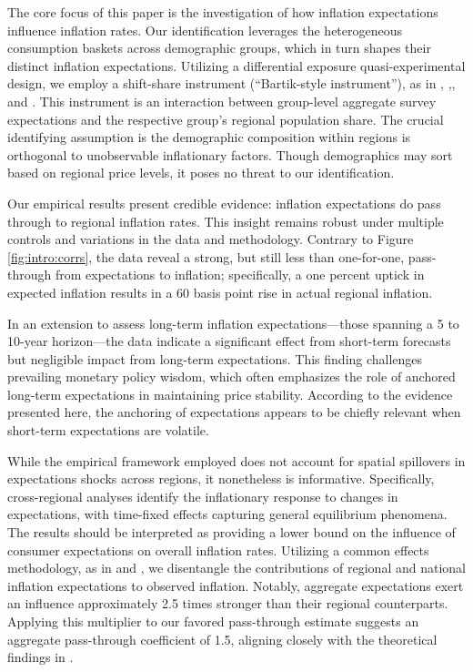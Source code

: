 \documentclass[12pt]{article}
\begin{document}
The core focus of this paper is the investigation of how inflation expectations influence inflation rates. Our identification leverages the heterogeneous consumption baskets across demographic groups, which in turn shapes their distinct inflation expectations. Utilizing a differential exposure quasi-experimental design, we employ a shift-share instrument (``Bartik-style instrument''), as in \cite{Bartik:1991}, \cite{BlanchardKatz},\cite{Almas:AER2012}, and \cite{Pinkhametal:AER2020}. This instrument is an interaction between group-level aggregate survey expectations and the respective group's regional population share. The crucial identifying assumption is the demographic composition within regions is orthogonal to unobservable inflationary factors. Though demographics may sort based on regional price levels, it poses no threat to our identification. 

Our empirical results present credible evidence: inflation expectations do pass through to regional inflation rates. This insight remains robust under multiple controls and variations in the data and methodology. Contrary to Figure \ref{fig:intro:corrs}, the data reveal a strong, but still less than one-for-one,  pass-through from expectations to inflation; specifically, a one percent uptick in expected inflation results in a 60 basis point rise in actual regional inflation.

In an extension to assess long-term inflation expectations—those spanning a 5 to 10-year horizon—the data indicate a significant effect from short-term forecasts but negligible impact from long-term expectations. This finding challenges prevailing monetary policy wisdom, which often emphasizes the role of anchored long-term expectations in maintaining price stability. According to the evidence presented here, the anchoring of expectations appears to be chiefly relevant when short-term expectations are volatile.

While the empirical framework employed does not account for spatial spillovers in expectations shocks across regions, it nonetheless is informative. Specifically, cross-regional analyses identify the inflationary response to changes in expectations, with time-fixed effects capturing general equilibrium phenomena. The results should be interpreted as providing a lower bound on the influence of consumer expectations on overall inflation rates. Utilizing a common effects methodology, as in \cite{Pesaran:2006} and \cite{HardingLamarche:EL}, we disentangle the contributions of regional and national inflation expectations to observed inflation. Notably, aggregate expectations exert an influence approximately 2.5 times stronger than their regional counterparts. Applying this multiplier to our favored pass-through estimate suggests an aggregate pass-through coefficient of 1.5,  aligning closely with the theoretical findings in \cite{Werning:expectsWP}.
\end{document}
